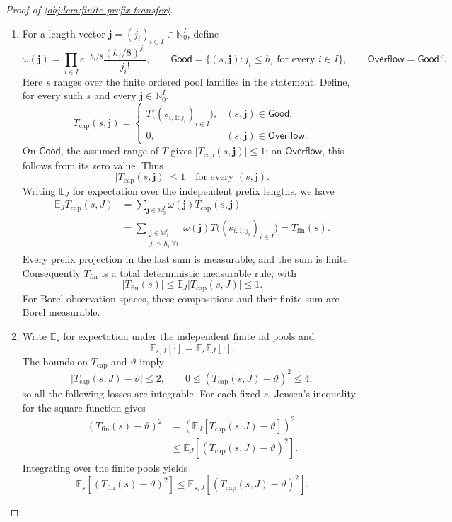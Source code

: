 \documentclass[11pt]{article}
\begin{document}
\begin{proof}[Proof of \cref{obj:lem:finite-prefix-transfer}]
\begin{enumerate}
\item For a length vector \(\mathbf j=(j_i)_{i\in I}\in\mathbb N_0^I\), define
\begingroup\small
\[
\omega(\mathbf j)
=
\prod_{i\in I}
e^{-h_i/8}\frac{(h_i/8)^{j_i}}{j_i!},
\qquad
\mathsf{Good}
=
\{(s,\mathbf j):j_i\le h_i\text{ for every }i\in I\},
\qquad
\mathsf{Overflow}=\mathsf{Good}^{\,c}.
\]
\endgroup
Here \(s\) ranges over the finite ordered pool families in the statement. Define, for every such \(s\) and every \(\mathbf j\in\mathbb N_0^I\),
\[
T_{\mathrm{cap}}(s,\mathbf j)
=
\begin{cases}
T\bigl((s_{i,1:j_i})_{i\in I}\bigr),
   &(s,\mathbf j)\in\mathsf{Good},\\
0,&(s,\mathbf j)\in\mathsf{Overflow}.
\end{cases}
\]
On \(\mathsf{Good}\), the assumed range of \(T\) gives
\(\lvert T_{\mathrm{cap}}(s,\mathbf j)\rvert\le1\); on
\(\mathsf{Overflow}\), this follows from its zero value. Thus
\[
\lvert T_{\mathrm{cap}}(s,\mathbf j)\rvert\le1
\quad\text{for every }(s,\mathbf j).
\]
Writing \(\mathbb E_J\) for expectation over the independent prefix lengths, we have
\[
\begin{aligned}
\mathbb E_J T_{\mathrm{cap}}(s,J)
&=
\sum_{\mathbf j\in\mathbb N_0^I}
\omega(\mathbf j)T_{\mathrm{cap}}(s,\mathbf j)\\
&=
\sum_{\substack{\mathbf j\in\mathbb N_0^I\\j_i\le h_i\ \forall i}}
\omega(\mathbf j)
T\bigl((s_{i,1:j_i})_{i\in I}\bigr)
=
T_{\mathrm{fin}}(s).
\end{aligned}
\]
Every prefix projection in the last sum is measurable, and the sum is finite. Consequently \(T_{\mathrm{fin}}\) is a total deterministic measurable rule, with
\[
\lvert T_{\mathrm{fin}}(s)\rvert
\le
\mathbb E_J\lvert T_{\mathrm{cap}}(s,J)\rvert
\le1.
\]
For Borel observation spaces, these compositions and their finite sum are Borel measurable. %

\item Write \(\mathbb E_s\) for expectation under the independent finite iid pools and
\[
\mathbb E_{s,J}[\cdot]=\mathbb E_s\mathbb E_J[\cdot].
\]
The bounds on \(T_{\mathrm{cap}}\) and \(\vartheta\) imply
\[
\lvert T_{\mathrm{cap}}(s,J)-\vartheta\rvert\le2,
\qquad
0\le(T_{\mathrm{cap}}(s,J)-\vartheta)^2\le4,
\]
so all the following losses are integrable. For each fixed \(s\), Jensen's inequality for the square function gives
\[
\begin{aligned}
(T_{\mathrm{fin}}(s)-\vartheta)^2
&=
\left(\mathbb E_J[T_{\mathrm{cap}}(s,J)-\vartheta]\right)^2\\
&\le
\mathbb E_J[(T_{\mathrm{cap}}(s,J)-\vartheta)^2].
\end{aligned}
\]
Integrating over the finite pools yields
\[
\mathbb E_s[(T_{\mathrm{fin}}(s)-\vartheta)^2]
\le
\mathbb E_{s,J}[(T_{\mathrm{cap}}(s,J)-\vartheta)^2].
\] %


\end{enumerate}
\end{proof}
\end{document}

